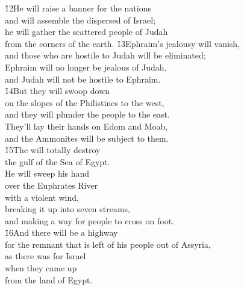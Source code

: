 \begin{poetry}
\poeml \v{12}He will raise a banner for the nations \\
\poemll    and will assemble the dispersed of Israel; \\
\poeml he will gather the scattered people of Judah \\
\poemll    from the corners of the earth.
\poeml \v{13}Ephraim's jealousy will vanish, \\
\poemll    and those who are hostile to Judah will be eliminated; \\
\poeml Ephraim will no longer be jealous of Judah, \\
\poemll    and Judah will not be hostile to Ephraim. \\
\poeml \v{14}But they will swoop down \\
\poemll    on the slopes of the Philistines to the west, \\
\poemlll       and they will plunder the people to the east. \\
\poeml They'll lay their hands on Edom and Moab, \\
\poemll    and the Ammonites will be subject to them. \\
\poeml \v{15}The  will totally destroy \\
\poemll    the gulf of the Sea of Egypt. \\
\poeml He will sweep his hand \\
\poemll    over the Euphrates River \\
\poemlll       with a violent wind, \\
\poeml breaking it up into seven streams, \\
\poemll    and making a way for people to cross on foot. \\
\poeml \v{16}And there will be a highway \\
\poemll    for the remnant that is left of his people out of Assyria, \\
\poeml as there was for Israel \\
\poemll    when they came up \\
\poemlll       from the land of Egypt.
\end{poetry}

